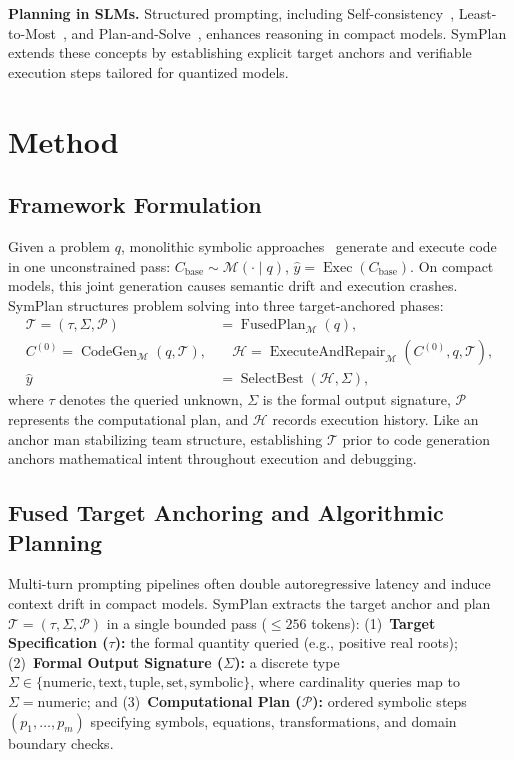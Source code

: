 \documentclass[runningheads]{llncs}
\begin{document}
\textbf{Planning in SLMs.} Structured prompting, including Self-consistency~\cite{wang2023selfconsistency}, Least-to-Most~\cite{zhou2023leasttomost}, and Plan-and-Solve~\cite{wang2023plan}, enhances reasoning in compact models. SymPlan extends these concepts by establishing explicit target anchors and verifiable execution steps tailored for quantized models.

\section{Method}
\label{sec:method}

\subsection{Framework Formulation}

Given a problem $q$, monolithic symbolic approaches~\cite{nezhad2025symcode} generate and execute code in one unconstrained pass: $C_{\text{base}} \sim \mathcal{M}(\cdot \mid q)$, $\hat{y} = \operatorname{Exec}(C_{\text{base}})$. On compact models, this joint generation causes semantic drift and execution crashes. SymPlan structures problem solving into three target-anchored phases:
\begin{align}
\mathcal{T} = (\tau, \Sigma, \mathcal{P}) &= \operatorname{FusedPlan}_{\mathcal{M}}(q), \label{eq:fused_plan} \\
C^{(0)} = \operatorname{CodeGen}_{\mathcal{M}}(q, \mathcal{T}), &\quad \mathcal{H} = \operatorname{ExecuteAndRepair}_{\mathcal{M}}(C^{(0)}, q, \mathcal{T}), \label{eq:codegen_repair} \\
\hat{y} &= \operatorname{SelectBest}(\mathcal{H}, \Sigma), \label{eq:select}
\end{align}
where $\tau$ denotes the queried unknown, $\Sigma$ is the formal output signature, $\mathcal{P}$ represents the computational plan, and $\mathcal{H}$ records execution history. Like an anchor man stabilizing team structure, establishing $\mathcal{T}$ prior to code generation anchors mathematical intent throughout execution and debugging.

\subsection{Fused Target Anchoring and Algorithmic Planning}

Multi-turn prompting pipelines often double autoregressive latency and induce context drift in compact models. SymPlan extracts the target anchor and plan $\mathcal{T} = (\tau, \Sigma, \mathcal{P})$ in a single bounded pass ($\le 256$ tokens):
(1)~\textbf{Target Specification ($\tau$):} the formal quantity queried (e.g., positive real roots);
(2)~\textbf{Formal Output Signature ($\Sigma$):} a discrete type $\Sigma \in \{\text{numeric}, \text{text}, \text{tuple}, \text{set}, \text{symbolic}\}$, where cardinality queries map to $\Sigma = \text{numeric}$; and
(3)~\textbf{Computational Plan ($\mathcal{P}$):} ordered symbolic steps $(p_1, \ldots, p_m)$ specifying symbols, equations, transformations, and domain boundary checks.
\end{document}

